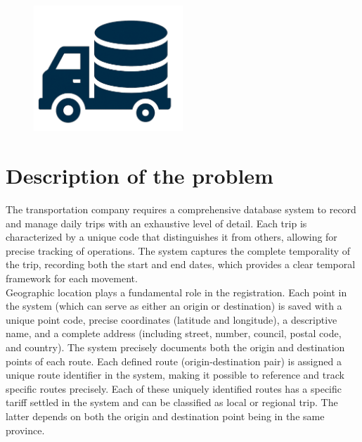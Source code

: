 \documentclass[11pt, a4paper]{article}
\title{\normalfont\spacedallcaps{Database design for transportation company}}
\author{\spacedlowsmallcaps{CarlosFOL}}
\date{}
\begin{document}

\maketitle



\tableofcontents

\vspace{2in}

\begin{figure}[h!]
    \centering
    \includegraphics[width=0.5\textwidth]{img/logo.png}
    \label{logo_db}
\end{figure}


\newpage


\section{Description of the problem}

The transportation company requires a comprehensive database system to record and manage daily trips with an exhaustive level of detail. 
Each trip is characterized by a unique code that distinguishes it from others, allowing for precise tracking of operations. 
The system captures the complete temporality of the trip, recording both the start and end dates, which provides a clear 
temporal framework for each movement. \\

Geographic location plays a fundamental role in the registration. Each point in the system (which can serve as either an origin or destination) 
is saved with a unique point code, precise coordinates (latitude and longitude), a descriptive name, and a complete address (including street, number, council, postal code, and country). 
The system precisely documents both the origin and destination points of each route. Each defined route (origin-destination pair) is assigned a unique 
route identifier in the system, making it possible to reference and track specific routes precisely. Each of these uniquely identified routes has a specific tariff settled in the system 
and can be classified as local or regional trip. The latter depends on both the origin and destination point being in the same province. \\
\end{document}
